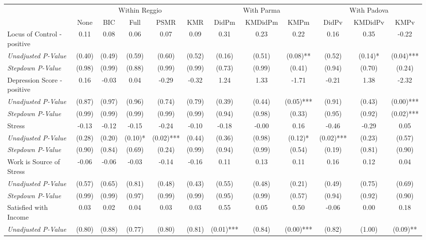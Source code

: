 \begin{tabular}{l c c c c c c c c c c c}
\toprule
& \multicolumn{5}{c}{Within Reggio} & \multicolumn{3}{c}{With Parma} & \multicolumn{3}{c}{With Padova} \\\cmidrule(lr){2-6} \cmidrule(lr){7-9} \cmidrule(lr){10-12}
 & None & BIC & Full & PSMR & KMR & DidPm & KMDidPm & KMPm & DidPv & KMDidPv & KMPv \\
\midrule
Locus of Control - positive & 0.11 & 0.08 & 0.06 & 0.07 & 0.09 & 0.31 & 0.23 & 0.22 & 0.16 & 0.35 & -0.22 \\
\quad \textit{Unadjusted P-Value} & (0.40) & (0.49) & (0.59) & (0.60) & (0.52) & (0.16) & (0.51) & (0.08)** & (0.52) & (0.14)* & (0.04)*** \\
\quad \textit{Stepdown P-Value} & (0.98) & (0.99) & (0.88) & (0.99) & (0.99) & (0.73) & (0.99) & (0.41) & (0.94) & (0.70) & (0.24) \\
Depression Score - positive & 0.16 & -0.03 & 0.04 & -0.29 & -0.32 & 1.24 & 1.33 & -1.71 & -0.21 & 1.38 & -2.32 \\
\quad \textit{Unadjusted P-Value} & (0.87) & (0.97) & (0.96) & (0.74) & (0.79) & (0.39) & (0.44) & (0.05)*** & (0.91) & (0.43) & (0.00)*** \\
\quad \textit{Stepdown P-Value} & (0.99) & (0.99) & (0.99) & (0.99) & (0.99) & (0.94) & (0.98) & (0.33) & (0.95) & (0.92) & (0.02)*** \\
Stress & -0.13 & -0.12 & -0.15 & -0.24 & -0.10 & -0.18 & -0.00 & 0.16 & -0.46 & -0.29 & 0.05 \\
\quad \textit{Unadjusted P-Value} & (0.28) & (0.20) & (0.10)* & (0.02)*** & (0.44) & (0.36) & (0.98) & (0.12)* & (0.02)*** & (0.23) & (0.57) \\
\quad \textit{Stepdown P-Value} & (0.90) & (0.84) & (0.69) & (0.24) & (0.99) & (0.94) & (0.99) & (0.54) & (0.19) & (0.81) & (0.90) \\
Work is Source of Stress & -0.06 & -0.06 & -0.03 & -0.14 & -0.16 & 0.11 & 0.13 & 0.11 & 0.16 & 0.12 & 0.04 \\
\quad \textit{Unadjusted P-Value} & (0.57) & (0.65) & (0.81) & (0.48) & (0.43) & (0.55) & (0.48) & (0.21) & (0.49) & (0.75) & (0.69) \\
\quad \textit{Stepdown P-Value} & (0.99) & (0.99) & (0.97) & (0.99) & (0.99) & (0.95) & (0.99) & (0.57) & (0.94) & (0.92) & (0.90) \\
Satisfied with Income & 0.03 & 0.02 & 0.04 & 0.03 & 0.03 & 0.55 & 0.05 & 0.50 & -0.06 & 0.00 & 0.18 \\
\quad \textit{Unadjusted P-Value} & (0.80) & (0.88) & (0.77) & (0.80) & (0.81) & (0.01)*** & (0.84) & (0.00)*** & (0.82) & (1.00) & (0.09)** \\

\end{tabular}
